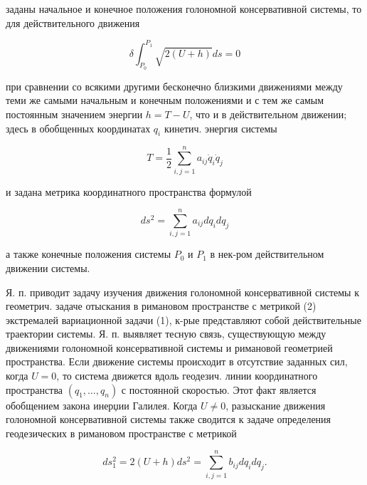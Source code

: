 \documentclass[10pt]{article}
\begin{document}
заданы начальное и конечное положения голономной консервативной системы, то для действительного движения



\[

\delta \int_{P_{0}}^{P_{1}} \sqrt{2(U+h)} d s=0

\]



при сравнении со всякими другими бесконечно близкими движениями между теми же самыми начальным и конечным положениями и с тем же самым постоянным значением энергии $h=T-U$, что и в действительном движении; здесь в обобщенных координатах $q_{i}$ кинетич. энергия системы



\[

T=\frac{1}{2} \sum_{i, j=1}^{n} a_{i j} \dot{q}_{i} \dot{q}_{j}

\]



и задана метрика координатного пространства формулой



\[

d s^{2}=\sum_{i, j=1}^{n} a_{i j} d q_{i} d q_{j}

\]



а также конечные положения системы $P_{0}$ и $P_{1}$ в нек-ром действительном движении системы.



Я. п. приводит задачу изучения движения голономной консервативной системы к геометрич. задаче отыскания в римановом пространстве с метрикой (2) экстремалей вариационной задачи (1), к-рые представляют собой действительные траектории системы. Я. п. выявляет тесную связь, существующую между движениями голономной консервативной системы и римановой геометрией пространства. Если движение системы происходит в отсутствие заданных сил, когда $U=0$, то система движется вдоль геодезич. линии координатного пространства $\left(q_{1}, \ldots, q_{n}\right)$ с постоянной скоростью. Этот факт является обобщением закона инерџии Галилея. Когда $U \neq 0$, разыскание движения голономной консервативной системы также сводится к задаче определения геодезических в римановом пространстве с метрикой



\[

d s_{1}^{2}=2(U+h) d s^{2}=\sum_{i, j=1}^{n} b_{i j} d q_{i} d q_{j} .

\]
\end{document}
